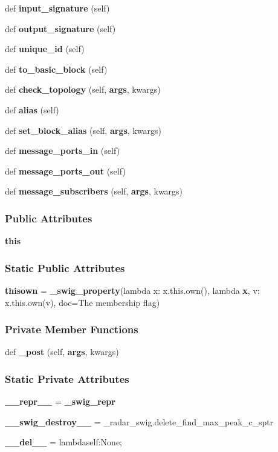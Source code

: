 \begin{DoxyCompactItemize}
\item 
def {\bf input\+\_\+signature} (self)
\item 
def {\bf output\+\_\+signature} (self)
\item 
def {\bf unique\+\_\+id} (self)
\item 
def {\bf to\+\_\+basic\+\_\+block} (self)
\item 
def {\bf check\+\_\+topology} (self, {\bf args}, kwargs)
\item 
def {\bf alias} (self)
\item 
def {\bf set\+\_\+block\+\_\+alias} (self, {\bf args}, kwargs)
\item 
def {\bf message\+\_\+ports\+\_\+in} (self)
\item 
def {\bf message\+\_\+ports\+\_\+out} (self)
\item 
def {\bf message\+\_\+subscribers} (self, {\bf args}, kwargs)
\end{DoxyCompactItemize}
\subsubsection*{Public Attributes}
\begin{DoxyCompactItemize}
\item 
{\bf this}
\end{DoxyCompactItemize}
\subsubsection*{Static Public Attributes}
\begin{DoxyCompactItemize}
\item 
{\bf thisown} = {\bf \+\_\+swig\+\_\+property}(lambda x\+: x.\+this.\+own(), lambda {\bf x}, v\+: x.\+this.\+own(v), doc=\textquotesingle{}The membership flag\textquotesingle{})
\end{DoxyCompactItemize}
\subsubsection*{Private Member Functions}
\begin{DoxyCompactItemize}
\item 
def {\bf \+\_\+post} (self, {\bf args}, kwargs)
\end{DoxyCompactItemize}
\subsubsection*{Static Private Attributes}
\begin{DoxyCompactItemize}
\item 
{\bf \+\_\+\+\_\+repr\+\_\+\+\_\+} = {\bf \+\_\+swig\+\_\+repr}
\item 
{\bf \+\_\+\+\_\+swig\+\_\+destroy\+\_\+\+\_\+} = \+\_\+radar\+\_\+swig.\+delete\+\_\+find\+\_\+max\+\_\+peak\+\_\+c\+\_\+sptr
\item 
{\bf \+\_\+\+\_\+del\+\_\+\+\_\+} = lambdaself\+:\+None;
\end{DoxyCompactItemize}


